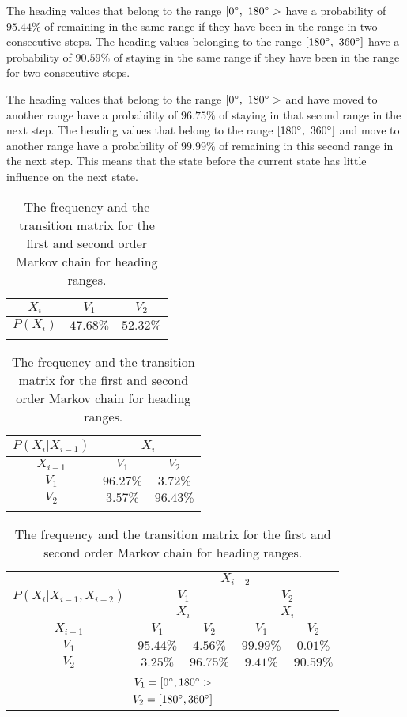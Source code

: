\documentclass[preprint,12pt]{elsarticle}
\begin{document}
The heading values that belong to the range $[0 \degree, \ 180 \degree>$ have a probability of $95.44\%$ of remaining in the same range if they have been in the range in two consecutive steps. The heading values belonging to the range $[180 \degree, \ 360 \degree]$ have a probability of $90.59\%$ of staying in the same range if they have been in the range for two consecutive steps.

The heading values that belong to the range $[0 \degree, \ 180 \degree>$ and have moved to another range have a probability of $96.75\%$ of staying in that second range in the next step. The heading values that belong to the range $[180 \degree, \ 360 \degree]$ and move to another range have a probability of $99.99\%$ of remaining in this second range in the next step. This means that the state before the current state has little influence on the next state.

\begin{table}[!ht]
\centering
\begin{tabular}{|c|c|c|}
\hline
$X_{i}$ & $V_{1}$ & $V_{2}$\\ \hline
$P(X_{i})$ & $47.68\%$ & $52.32\%$\\ \hline
\multicolumn{3}{c}{}\\
\end{tabular}

\begin{tabular}{|c|c|c|}
\hline
$P(X_{i}|X_{i-1})$ & \multicolumn{2}{|c|}{$X_{i}$}\\ \hline
$X_{i-1}$ & $V_{1}$ & $V_{2}$\\ \hline
$V_{1}$ & $96.27\%$ & $3.72\%$\\ \hline
$V_{2}$ & $3.57\%$ & $96.43\%$\\ \hline
\multicolumn{3}{c}{}\\
\end{tabular}

\begin{tabular}{|c|c|c|c|c|}
\hline
\multirow{3}{*}{$P(X_{i}|X_{i-1},X_{i-2})$} & \multicolumn{4}{|c|}{$X_{i-2}$}\\ \cline{2-5}
 & \multicolumn{2}{|c|}{$V_{1}$} & \multicolumn{2}{|c|}{$V_{2}$}\\ \cline{2-5}
 & \multicolumn{2}{|c|}{$X_{i}$} & \multicolumn{2}{|c|}{$X_{i}$}\\ \hline
$X_{i-1}$ & $V_{1}$ & $V_{2}$ & $V_{1}$ & $V_{2}$\\ \hline
$V_{1}$ & $95.44\%$ & $4.56\%$ & $99.99\%$ & $0.01\%$\\ \hline
$V_{2}$ & $3.25\%$ & $96.75\%$ & $9.41\%$ & $90.59\%$\\ \hline
\multicolumn{5}{c}{}\\
\multicolumn{5}{c}{$V_{1} = [0 \degree, 180 \degree>$}\\
\multicolumn{5}{c}{$V_{2} = [180 \degree, 360 \degree]$}\\
\end{tabular}
\caption{The frequency and the transition matrix for the first and second order Markov chain for heading ranges.}
\label{tab:direction}
\end{table}
\end{document}
